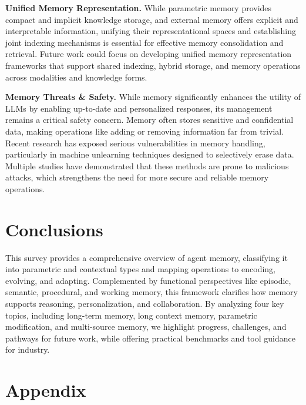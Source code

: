 \documentclass[manuscript,screen]{acmart}
\begin{document}
\par{\textbf{Unified Memory Representation.} While parametric memory \citep{yang2024text} provides compact and implicit knowledge storage, and external memory \citep{zhong2024memorybank} offers explicit and interpretable information, unifying their representational spaces and establishing joint indexing mechanisms is essential for effective memory consolidation and retrieval. Future work could focus on developing unified memory representation frameworks that support shared indexing, hybrid storage, and memory operations across modalities and knowledge forms.}

\par{\textbf{Memory Threats \& Safety.}}
While memory significantly enhances the utility of LLMs by enabling up-to-date and personalized responses, its management remains a critical safety concern. Memory often stores sensitive and confidential data, making operations like adding or removing information far from trivial. Recent research has exposed serious vulnerabilities in memory handling, particularly in machine unlearning techniques designed to selectively erase data. Multiple studies \citep{machine-unlearning-threat-survey-ziyao-etal-2025, barez2025openproblemsmachineunlearning} have demonstrated that these methods are prone to malicious attacks, which strengthens the need for more secure and reliable memory operations.

\section{Conclusions}
This survey provides a comprehensive overview of agent memory, classifying it into parametric and contextual types and mapping operations to encoding, evolving, and adapting. Complemented by functional perspectives like episodic, semantic, procedural, and working memory, this framework clarifies how memory supports reasoning, personalization, and collaboration. By analyzing four key topics, including long-term memory, long context memory, parametric modification, and multi-source memory, we highlight progress, challenges, and pathways for future work, while offering practical benchmarks and tool guidance for industry. 



\newpage
\appendix
\section*{Appendix}
\end{document}
